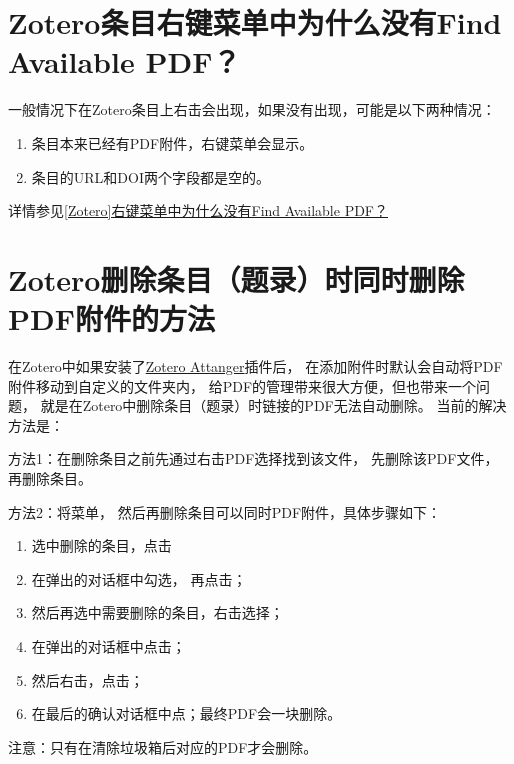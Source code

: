 \documentclass[theorem=false,mathfont=none,openany,sub3section]{easybook}
\begin{document}
{\begin{enumerate}
\end{enumerate}

\section{Zotero条目右键菜单中为什么没有Find Available PDF？}\label{sec:Find_PDF}	
一般情况下在Zotero条目上右击会出现，如果没有出现，可能是以下两种情况：
\begin{enumerate}
	\item 条目本来已经有PDF附件，右键菜单会显示。
	\item 条目的URL和DOI两个字段都是空的。
\end{enumerate}
详情参见\href{https://zhuanlan.zhihu.com/p/348697024}
{[Zotero]右键菜单中为什么没有Find Available PDF？}

\section{Zotero删除条目（题录）时同时删除PDF附件的方法}\label{sec:Delete_attach}						
在Zotero中如果安装了\href{https://github.com/MuiseDestiny/zotero-attanger}{Zotero Attanger}插件后，
在添加附件时默认会自动将PDF附件移动到自定义的文件夹内，
给PDF的管理带来很大方便，但也带来一个问题，
就是在Zotero中删除条目（题录）时链接的PDF无法自动删除。
当前的解决方法是：

方法1：在删除条目之前先通过右击PDF选择找到该文件，
先删除该PDF文件，再删除条目。

方法2：将菜单，
然后再删除条目可以同时PDF附件，具体步骤如下：
\begin{enumerate}

 
	\item 选中删除的条目，点击
	\item 在弹出的对话框中勾选，
	再点击；
	\item 然后再选中需要删除的条目，右击选择；
	\item 在弹出的对话框中点击；
	\item 然后右击，点击；
	\item 在最后的确认对话框中点；最终PDF会一块删除。
\end{enumerate}

注意：只有在清除垃圾箱后对应的PDF才会删除。

}
\end{document}
